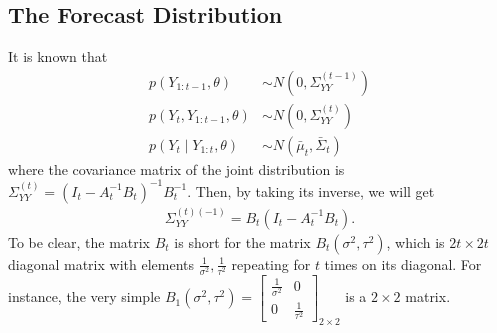 \subsection{The Forecast Distribution}

It is known that 
\begin{align*}
p(Y_{1:t-1},\theta) &\sim N\left( 0,\Sigma_{YY}^{(t-1)} \right)\\
p(Y_{t},Y_{1:t-1},\theta) &\sim N\left( 0,\Sigma_{YY}^{(t)} \right)\\
p(Y_{t}\mid Y_{1:t},\theta) &\sim N\left( \bar{\mu}_{t},\bar{\Sigma}_{t} \right)
\end{align*}
where the covariance matrix of the joint distribution is $\Sigma_{YY}^{(t)} = \left(I_{t}-A_{t}^{-1}B_{t}\right)^{-1}B_{t}^{-1}$. Then, by taking its inverse, we will get
\begin{align*}
\Sigma_{YY}^{(t) (-1)} = B_{t}(I_{t}-A_{t}^{-1}B_{t}).
\end{align*}
To be clear, the matrix $B_{t}$ is short for the matrix $B_{t}(\sigma^2,\tau^2)$, which is $2t\times 2t$ diagonal matrix with elements $\frac{1}{\sigma^2},\frac{1}{\tau^2}$ repeating for $t$ times on its diagonal. For instance, the very simple $B_1(\sigma^2,\tau^2) = 
\begin{bmatrix}
\frac{1}{\sigma^2} & 0  \\
0 & \frac{1}{\tau^2}
\end{bmatrix}_{2\times 2}$ is a $2\times 2$ matrix. 

